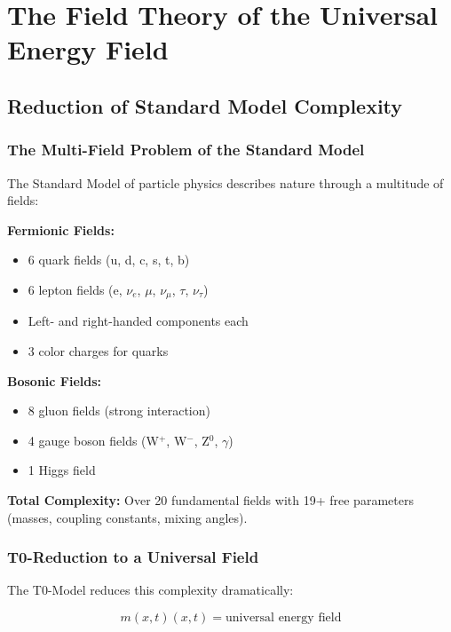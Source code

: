 \documentclass[12pt,a4paper]{report}
\newcommand{\mfield}{m(x,t)}  %
\begin{document}
	\chapter{The Field Theory of the Universal Energy Field}\label{chap:universal_field_theory}
	
	\section{Reduction of Standard Model Complexity}\label{sec:sm_complexity}
	
	\subsection{The Multi-Field Problem of the Standard Model}\label{subsec:multifield_problem}
	
	The Standard Model of particle physics describes nature through a multitude of fields:
	
	\textbf{Fermionic Fields:}
	\begin{itemize}
		\item 6 quark fields (u, d, c, s, t, b)
		\item 6 lepton fields (e, $\nu_e$, $\mu$, $\nu_\mu$, $\tau$, $\nu_\tau$)
		\item Left- and right-handed components each
		\item 3 color charges for quarks
	\end{itemize}
	
	\textbf{Bosonic Fields:}
	\begin{itemize}
		\item 8 gluon fields (strong interaction)
		\item 4 gauge boson fields (W$^+$, W$^-$, Z$^0$, $\gamma$)
		\item 1 Higgs field
	\end{itemize}
	
	\textbf{Total Complexity:}
	Over 20 fundamental fields with 19+ free parameters (masses, coupling constants, mixing angles).
	
	\subsection{T0-Reduction to a Universal Field}\label{subsec:t0_reduction}
	
	The T0-Model reduces this complexity dramatically:
	
	\begin{equation}\label{eq:universal_energy_field}
		\mfield(x,t) = \text{universal energy field}
	\end{equation}
	
\end{document}

